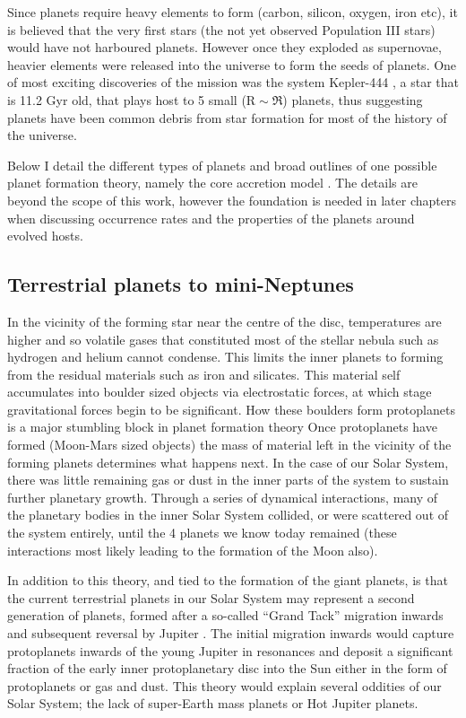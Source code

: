 Since planets require heavy elements to form (carbon, silicon, oxygen, iron etc), it is believed that the very first stars (the not yet observed Population III stars) would have not harboured planets. However once they exploded as supernovae, heavier elements were released into the universe to form the seeds of planets. One of most exciting discoveries of the \Kepler mission was the system Kepler-444 \citep{kep444}, a star that is 11.2 Gyr old, that plays host to 5 small ($\textrm{R}\sim\Re$) planets, thus suggesting planets have been common debris from star formation for most of the history of the universe. 

Below I detail the different types of planets and broad outlines of one possible planet formation theory, namely the core accretion model \citep{1993Lissauer,1996Pollack}. The details are beyond the scope of this work, however the foundation is needed in later chapters when discussing occurrence rates and the properties of the planets around evolved hosts.

\subsection{Terrestrial planets to mini-Neptunes}
In the vicinity of the forming star near the centre of the disc, temperatures are higher and so volatile gases that constituted most of the stellar nebula such as hydrogen and helium cannot condense. This limits the inner planets to forming from the residual materials such as iron and silicates. This material self accumulates into boulder sized objects via electrostatic forces, at which stage gravitational forces begin to be significant. How these boulders form protoplanets is a major stumbling block in planet formation theory %
Once protoplanets have formed (Moon-Mars sized objects) the mass of material left in the vicinity of the forming planets determines what happens next. In the case of our Solar System, there was little remaining gas or dust in the inner parts of the system to sustain further planetary growth. Through a series of dynamical interactions, many of the planetary bodies in the inner Solar System collided, or were scattered out of the system entirely, until the 4 planets we know today remained (these interactions most likely leading to the formation of the Moon also). 

In addition to this theory, and tied to the formation of the giant planets, is that the current terrestrial planets in our Solar System may represent a second generation of planets, formed after a so-called ``Grand Tack'' migration inwards and subsequent reversal by Jupiter \citep{2001Masset,2011Walsh,2015Batygin}. The initial migration inwards would capture protoplanets inwards of the young Jupiter in resonances and deposit a significant fraction of the early inner protoplanetary disc into the Sun \ndash either in the form of protoplanets or gas and dust. This theory would explain several oddities of our Solar System; the lack of super-Earth mass planets or Hot Jupiter planets. 

